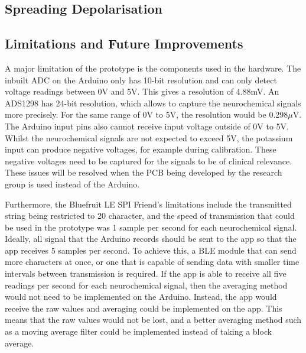 



\subsection{Spreading Depolarisation}

\subsection{Limitations and Future Improvements}
A major limitation of the prototype is the components used in the hardware. The inbuilt ADC on the Arduino only has 10-bit resolution and can only detect voltage readings between 0V and 5V. This gives a resolution of 4.88mV. An ADS1298 has 24-bit resolution, which allows to capture the neurochemical signals more precisely. For the same range of 0V to 5V, the resolution would be 0.298$\mu$V. The Arduino input pins also cannot receive input voltage outside of 0V to 5V. Whilst the neurochemical signals are not expected to exceed 5V, the potassium input can produce negative voltages, for example during calibration. These negative voltages need to be captured for the signals to be of clinical relevance. These issues will be resolved when the PCB being developed by the research group is used instead of the Arduino.

Furthermore, the Bluefruit LE SPI Friend's limitations include the transmitted string being restricted to 20 character, and the speed of transmission that could be used in the prototype was 1 sample per second for each neurochemical signal. Ideally, all signal that the Arduino records should be sent to the app so that the app receives 5 samples per second. To achieve this, a BLE module that can send more characters at once, or one that is capable of sending data with smaller time intervals between transmission is required. If the app is able to receive all five readings per second for each neurochemical signal, then the averaging method would not need to be implemented on the Arduino. Instead, the app would receive the raw values and averaging could be implemented on the app. This means that the raw values would not be lost, and a better averaging method such as a moving average filter could be implemented instead of taking a block average.

